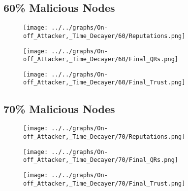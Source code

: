 \begin{minipage}[t]{0.49\columnwidth}
\subsection*{60\% Malicious Nodes}
    \begin{figure}[H]
        \centering
        \texttt{[image: ../../graphs/On-off\_Attacker,\_Time\_Decayer/60/Reputations.png]}
    \end{figure}
    \begin{figure}[H]
        \centering
        \texttt{[image: ../../graphs/On-off\_Attacker,\_Time\_Decayer/60/Final\_QRs.png]}
    \end{figure}
\end{minipage}
\begin{minipage}[t]{0.49\columnwidth}
    \begin{figure}[H]
        \centering
        \texttt{[image: ../../graphs/On-off\_Attacker,\_Time\_Decayer/60/Final\_Trust.png]}
    \end{figure}
\end{minipage}

\begin{minipage}[t]{0.49\columnwidth}
\subsection*{70\% Malicious Nodes}
    \begin{figure}[H]
        \centering
        \texttt{[image: ../../graphs/On-off\_Attacker,\_Time\_Decayer/70/Reputations.png]}
    \end{figure}
    \begin{figure}[H]
        \centering
        \texttt{[image: ../../graphs/On-off\_Attacker,\_Time\_Decayer/70/Final\_QRs.png]}
    \end{figure}
\end{minipage}
\begin{minipage}[t]{0.49\columnwidth}
    \begin{figure}[H]
        \centering
        \texttt{[image: ../../graphs/On-off\_Attacker,\_Time\_Decayer/70/Final\_Trust.png]}
    \end{figure}
\end{minipage}

